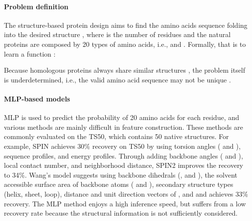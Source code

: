 \documentclass{article}
\begin{document}
\vspace{-2mm}
\paragraph{Problem definition} The structure-based protein design aims to find the amino acids sequence  folding into the desired structure , where  is the number of residues and the natural proteins are composed by 20 types of amino acids, i.e.,  and . Formally, that is to learn a function :

Because homologous proteins always share similar structures \citep{pearson2005limits}, the problem itself is underdetermined, i.e., the valid amino acid sequence may not be unique \citep{gao2020deep}. 




\vspace{-2mm}
\paragraph{MLP-based models} 
MLP is used to predict the probability of 20 amino acids for each residue, and various methods are mainly difficult in feature construction. These methods are commonly evaluated on the TS50, which contains 50 native structures. For example, SPIN \citep{li2014direct} achieves 30\% recovery on TS50 by using torsion angles ( and ), sequence profiles, and energy profiles. Through adding backbone angles ( and ), local contact number, and neighborhood distance, SPIN2 \citep{o2018spin2} improves the recovery to 34\%. Wang's model \citep{wang2018computational} suggests using backbone dihedrals (,  and ), the solvent accessible surface area of backbone atoms ( and ), secondary structure types (helix, sheet, loop),  distance and unit direction vectors of ,  and  and achieves 33\% recovery. The MLP method enjoys a high inference speed, but suffers from a low recovery rate because the structural information is not sufficiently considered.

\vspace{-2mm}
\end{document}
